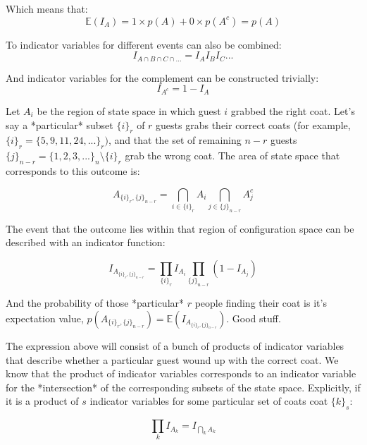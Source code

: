 Which means that:
\begin{equation}
\mathbb{E}(I_A) = 1\times p(A) + 0\times p(A^c)= p(A)
\end{equation}

To indicator variables for different events can also be combined:
\begin{equation}
I_{A\cap B\cap C\cap ...} = I_A I_B I_C ...
\end{equation}

And indicator variables for the complement can be constructed trivially:
\begin{equation}
I_{A^c} = 1 - I_A
\end{equation}

Let $A_i$ be the region of state space in which guest $i$ grabbed the right coat. Let's say a *particular* subset $\{i\}_r$ of $r$ guests grabs their correct coats (for example, $\{i\}_r = \{5,9,11,24,...\}_r)$, and that the set of remaining $n-r$ guests $\{j\}_{n-r}= \{1,2,3,...\}_n\setminus\{i\}_r$ grab the wrong coat. The area of state space that corresponds to this outcome is:

\begin{equation}
A_{\{i\}_r,\{j\}_{n-r}}=\bigcap_{i\in\{i\}_r}A_i\bigcap_{j\in\{j\}_{n-r}}A_j^c
\end{equation}

The event that the outcome lies within that region of configuration space can be described with an indicator function:

\begin{equation}
I_{A_{\{i\}_r,\{j\}_{n-r}}} = \prod_{\{i\}_r}I_{A_i}\prod_{\{j\}_{n-r}}(1-I_{A_j})
\end{equation}

And the probability of those *particular* $r$ people finding their coat is it's expectation value, $p(A_{\{i\}_r,\{j\}_{n-r}}) = \mathbb{E}(I_{A_{\{i\}_r,\{j\}_{n-r}}})$. Good stuff.

The expression above will consist of a bunch of products of indicator variables that describe whether a particular guest wound up with the correct coat. We know that the product of indicator variables corresponds to an indicator variable for the *intersection* of the corresponding subsets of the state space. Explicitly, if it is a product of $s$ indicator variables for some particular set of coats coat $\{k\}_s$:

\begin{equation}
\prod_{k} I_{A_k} = I_{\bigcap_{k}A_k}
\end{equation}

